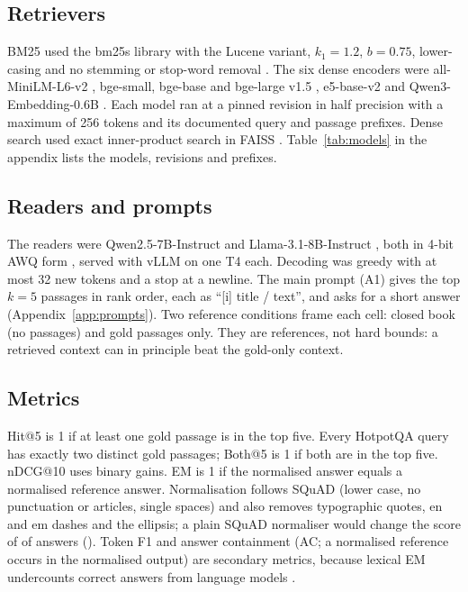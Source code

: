 \subsection{Retrievers}\label{sec:retrievers}
BM25 used the bm25s library \citep{lu2024bm25s} with the Lucene variant, $k_1=1.2$, $b=0.75$, lower-casing and no stemming or stop-word removal \citep{robertson2009bm25}. The six dense encoders were all-MiniLM-L6-v2 \citep{reimers2019sbert,wang2020minilm}, bge-small, bge-base and bge-large v1.5 \citep{xiao2024cpack}, e5-base-v2 \citep{wang2022e5} and Qwen3-Embedding-0.6B \citep{zhang2025qwen3emb}. Each model ran at a pinned revision in half precision with a maximum of 256 tokens and its documented query and passage prefixes. Dense search used exact inner-product search in FAISS \citep{johnson2021faiss}. Table~\ref{tab:models} in the appendix lists the models, revisions and prefixes.

\subsection{Readers and prompts}\label{sec:readers}
The readers were Qwen2.5-7B-Instruct \citep{qwen2025qwen25} and Llama-3.1-8B-Instruct \citep{grattafiori2024llama3}, both in 4-bit AWQ form \citep{lin2024awq}, served with vLLM \citep{kwon2023vllm} on one T4 each. Decoding was greedy with at most 32 new tokens and a stop at a newline. The main prompt (A1) gives the top $k=5$ passages in rank order, each as ``[i] title / text'', and asks for a short answer (Appendix~\ref{app:prompts}). Two reference conditions frame each cell: closed book (no passages) and gold passages only. They are references, not hard bounds: a retrieved context can in principle beat the gold-only context.

\subsection{Metrics}\label{sec:metrics}
Hit@5 is 1 if at least one gold passage is in the top five. Every HotpotQA query has exactly two distinct gold passages; Both@5 is 1 if both are in the top five. nDCG@10 uses binary gains. EM is 1 if the normalised answer equals a normalised reference answer. Normalisation follows SQuAD (lower case, no punctuation or articles, single spaces) and also removes typographic quotes, en and em dashes and the ellipsis; a plain SQuAD normaliser would change the score of  of  answers (). Token F1 and answer containment (AC; a normalised reference occurs in the normalised output) are secondary metrics, because lexical EM undercounts correct answers from language models \citep{kamalloo2023}.

